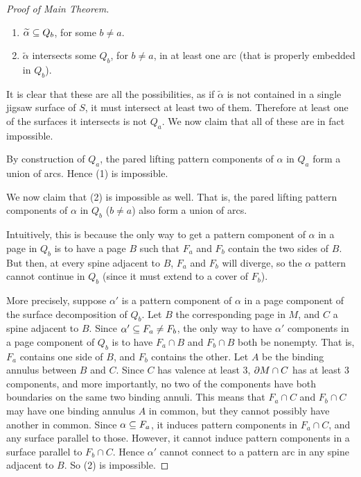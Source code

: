 \begin{proof}[Proof of Main Theorem]
\begin{enumerate}
\item $\widetilde{\alpha} \subseteq Q_b$, for some $b \neq a$.

\item $\widetilde{\alpha}$ intersects some $Q_b$, for $b \neq a$, in at least
one arc (that is properly embedded in $Q_b$).

\end{enumerate}

It is clear that these are all the possibilities, as if $\widetilde{\alpha}$ is
not contained in a single jigsaw surface of $S$, it must intersect at least two
of them. Therefore at least one of the surfaces it intersects is not $Q_a$. We
now claim that all of these are in fact impossible.

By construction of $Q_a$, the pared lifting pattern components of $\alpha$ in
$Q_a$ form a union of arcs. Hence (1) is impossible.

We now claim that (2) is impossible as well. That is, the pared lifting pattern
components of $\alpha$ in $Q_b$ ($b \neq a$) also form a union of arcs.

Intuitively, this is because the only way to get a pattern component of
$\alpha$ in a page in $Q_b$ is to have a page $B$ such that $F_a$ and $F_b$
contain the two sides of $B$.  But then, at every spine adjacent to $B$, $F_a$
and $F_b$ will diverge, so the $\alpha$ pattern cannot continue in $Q_b$ (since
it must extend to a cover of $F_b$).

More precisely, suppose $\alpha'$ is a pattern component of $\alpha$ in a page
component of the surface decomposition of $Q_b$. Let $B$ the corresponding page
in $M$, and $C$ a spine adjacent to $B$. Since $\alpha' \subseteq F_a \neq F_b$, the
only way to have $\alpha'$ components in a page component of $Q_b$ is to have
$F_a \cap B$ and $F_b \cap B$ both be nonempty. That is, $F_a$ contains one
side of $B$, and $F_b$ contains the other. Let $A$ be the binding annulus
between $B$ and $C$.  Since $C$ has valence at least 3, $\partial M \cap C$ has at
least 3 components, and more importantly, no two of the components have both
boundaries on the same two binding annuli. This means that $F_a \cap C$ and
$F_b \cap C$ may have one binding annulus $A$ in common, but they cannot
possibly have another in common.  Since $\alpha \subseteq F_a$, it induces pattern
components in $F_a \cap C$, and any surface parallel to those. However, it
cannot induce pattern components in a surface parallel to $F_b \cap C$. Hence
$\alpha'$ cannot connect to a pattern arc in any spine adjacent to $B$. So (2)
is impossible.


\end{proof}
